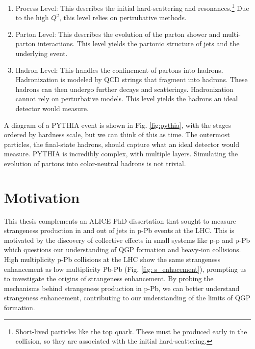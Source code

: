 \documentclass[../main.tex]{subfiles}
\begin{document}
\begin{enumerate}
    \item Process Level: This describes the initial hard-scattering and resonances.\footnote{Short-lived particles like the top quark. These must be produced early in the collision, so they are associated with the initial hard-scattering.} Due to the high $Q^2$, this level relies on pertrubative methods. 
    \item Parton Level: This describes the evolution of the parton shower and multi-parton interactions. This level yields the partonic structure of jets and the underlying event. 
    \item Hadron Level: This handles the confinement of partons into hadrons. Hadronization is modeled by QCD strings that fragment into hadrons. These hadrons can then undergo further decays and scatterings. Hadronization cannot rely on perturbative models. This level yields the hadrons an ideal detector would measure. 
\end{enumerate}

A diagram of a PYTHIA event is shown in Fig. \ref{fig:pythia}, with the stages ordered by hardness scale, but we can think of this as time. The outermost particles, the final-state hadrons, should capture what an ideal detector would measure. PYTHIA is incredibly complex, with multiple layers. Simulating the evolution of partons into color-neutral hadrons is not trivial. 


\section{Motivation}


This thesis complements an ALICE PhD dissertation that sought to measure strangeness production in and out of jets in p-Pb events at the LHC. This is motivated by the discovery of collective effects in small systems like p-p and p-Pb which questions our understanding of QGP formation and heavy-ion collisions. High multiplicity p-Pb collisions at the LHC show the same strangeness enhancement as low multiplicity Pb-Pb (Fig. \ref{fig: s_enhacement}), prompting us to investigate the origins of strangeness enhancement. By probing the mechanisms behind strangeness production in p-Pb, we can better understand strangeness enhancement, contributing to our understanding of the limits of QGP formation.  
\end{document}
